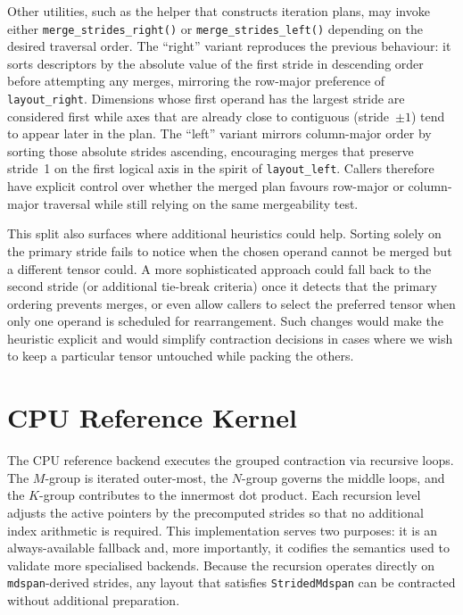 \documentclass[11pt]{article}
\begin{document}
Other utilities, such as the helper that constructs iteration plans, may invoke either
\texttt{merge\_strides\_right()} or \texttt{merge\_strides\_left()} depending on the desired
traversal order.  The ``right'' variant reproduces the previous behaviour: it sorts descriptors by
the absolute value of the first stride in descending order before attempting any merges, mirroring
the row-major preference of \texttt{layout\_right}.  Dimensions whose first operand has the largest
stride are considered first while axes that are already close to contiguous (stride~$\pm 1$) tend to
appear later in the plan.  The ``left'' variant mirrors column-major order by sorting those absolute
strides ascending, encouraging merges that preserve stride~1 on the first logical axis in the spirit
of \texttt{layout\_left}.  Callers therefore have explicit control over whether the merged plan
favours row-major or column-major traversal while still relying on the same mergeability test.

This split also surfaces where additional heuristics could help.  Sorting solely on the primary
stride fails to notice when the chosen operand cannot be merged but a different tensor could.  A
more sophisticated approach could fall back to the second stride (or additional tie-break criteria)
once it detects that the primary ordering prevents merges, or even allow callers to select the
preferred tensor when only one operand is scheduled for rearrangement.  Such changes would make
the heuristic explicit and would simplify contraction decisions in cases where we wish to keep a
particular tensor untouched while packing the others.

\section{CPU Reference Kernel}
The CPU reference backend executes the grouped contraction via recursive loops.  The $M$-group is
iterated outer-most, the $N$-group governs the middle loops, and the $K$-group contributes to the
innermost dot product.  Each recursion level adjusts the active pointers by the precomputed strides
so that no additional index arithmetic is required.  This implementation serves two purposes: it is
an always-available fallback and, more importantly, it codifies the semantics used to validate more
specialised backends.  Because the recursion operates directly on \texttt{mdspan}-derived strides,
any layout that satisfies \texttt{StridedMdspan} can be contracted without additional preparation.
\end{document}
